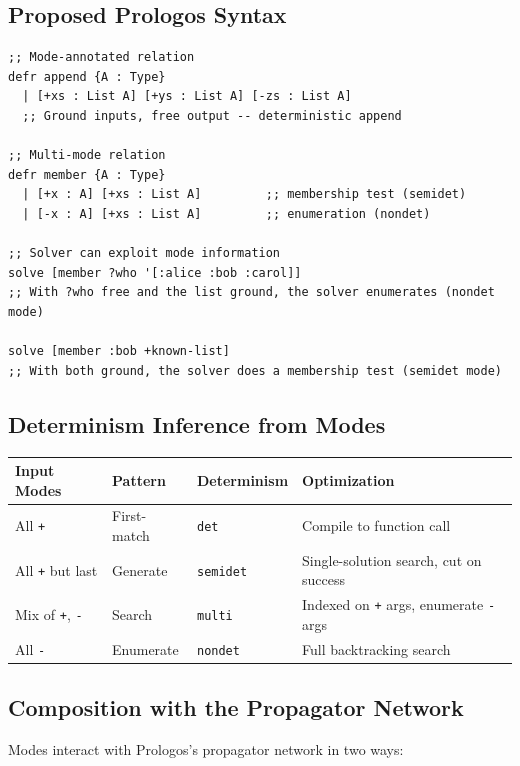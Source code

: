 \documentclass[11pt]{article}
\begin{document}
\subsection{Proposed Prologos Syntax}
\label{sec:orgdcf5a0b}

\begin{verbatim}
;; Mode-annotated relation
defr append {A : Type}
  | [+xs : List A] [+ys : List A] [-zs : List A]
  ;; Ground inputs, free output -- deterministic append

;; Multi-mode relation
defr member {A : Type}
  | [+x : A] [+xs : List A]         ;; membership test (semidet)
  | [-x : A] [+xs : List A]         ;; enumeration (nondet)

;; Solver can exploit mode information
solve [member ?who '[:alice :bob :carol]]
;; With ?who free and the list ground, the solver enumerates (nondet mode)

solve [member :bob +known-list]
;; With both ground, the solver does a membership test (semidet mode)
\end{verbatim}
\subsection{Determinism Inference from Modes}
\label{sec:org0c5c5b2}

\begin{center}
\begin{tabular}{llll}
Input Modes & Pattern & Determinism & Optimization\\
\hline
All \texttt{+} & First-match & \texttt{det} & Compile to function call\\
All \texttt{+} but last & Generate & \texttt{semidet} & Single-solution search, cut on success\\
Mix of \texttt{+}, \texttt{-} & Search & \texttt{multi} & Indexed on \texttt{+} args, enumerate \texttt{-} args\\
All \texttt{-} & Enumerate & \texttt{nondet} & Full backtracking search\\
\end{tabular}
\end{center}
\subsection{Composition with the Propagator Network}
\label{sec:org28d94c6}

Modes interact with Prologos's propagator network in two ways:
\end{document}
